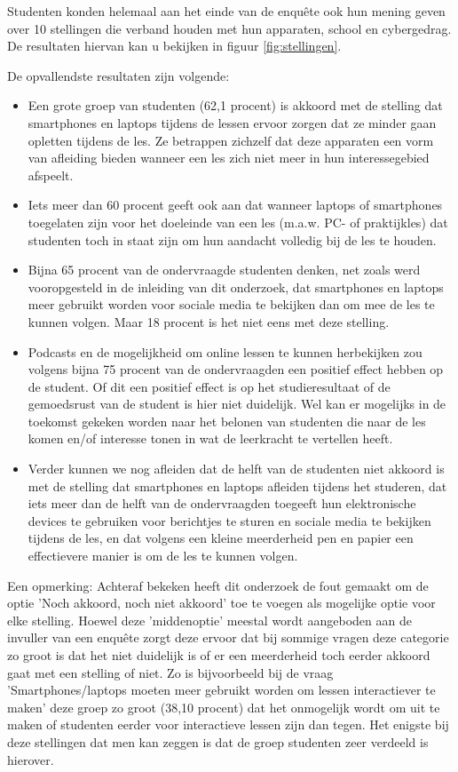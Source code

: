 Studenten konden helemaal aan het einde van de enquête ook hun mening geven over 10 stellingen die verband houden met hun apparaten, school en cybergedrag. De resultaten hiervan kan u bekijken in figuur \ref{fig:stellingen}. 

De opvallendste resultaten zijn volgende:
\begin{itemize}
	\item Een grote groep van studenten (62,1 procent) is akkoord met de stelling dat smartphones en laptops tijdens de lessen ervoor zorgen dat ze minder gaan opletten tijdens de les. Ze betrappen zichzelf dat deze apparaten een vorm van afleiding bieden wanneer een les zich niet meer in hun interessegebied afspeelt.
	\item Iets meer dan 60 procent geeft ook aan dat wanneer laptops of smartphones toegelaten zijn voor het doeleinde van een les (m.a.w. PC- of praktijkles) dat studenten toch in staat zijn om hun aandacht volledig bij de les te houden. 
	\item Bijna 65 procent van de ondervraagde studenten denken, net zoals werd vooropgesteld in de inleiding van dit onderzoek, dat smartphones en laptops meer gebruikt worden voor sociale media te bekijken dan om mee de les te kunnen volgen. Maar 18 procent is het niet eens met deze stelling. 
	\item Podcasts en de mogelijkheid om online lessen te kunnen herbekijken zou volgens bijna 75 procent van de ondervraagden een positief effect hebben op de student. Of dit een positief effect is op het studieresultaat of de gemoedsrust van de student is hier niet duidelijk. Wel kan er mogelijks in de toekomst gekeken worden naar het belonen van studenten die naar de les komen en/of interesse tonen in wat de leerkracht te vertellen heeft.
	\item Verder kunnen we nog afleiden dat de helft van de studenten niet akkoord is met de stelling dat smartphones en laptops afleiden tijdens het studeren, dat iets meer dan de helft van de ondervraagden toegeeft hun elektronische devices te gebruiken voor berichtjes te sturen en sociale media te bekijken tijdens de les, en dat volgens een kleine meerderheid pen en papier een effectievere manier is om de les te kunnen volgen.
\end{itemize}

Een opmerking: Achteraf bekeken heeft dit onderzoek de fout gemaakt om de optie 'Noch akkoord, noch niet akkoord' toe te voegen als mogelijke optie voor elke stelling. Hoewel deze 'middenoptie' meestal wordt aangeboden aan de invuller van een enquête zorgt deze ervoor dat bij sommige vragen deze categorie zo groot is dat het niet duidelijk is of er een meerderheid toch eerder akkoord gaat met een stelling of niet. Zo is bijvoorbeeld bij de vraag 'Smartphones/laptops moeten meer gebruikt worden om lessen interactiever te maken' deze groep zo groot (38,10 procent) dat het onmogelijk wordt om uit te maken of studenten eerder voor interactieve lessen zijn dan tegen. Het enigste bij deze stellingen dat men kan zeggen is dat de groep studenten zeer verdeeld is hierover.

